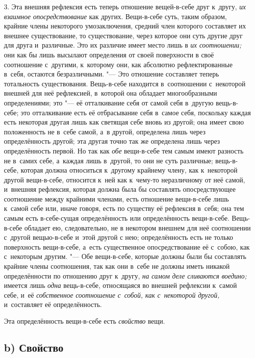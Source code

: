 3. Эта внешняя рефлексия есть теперь отношение вещей-в-себе друг к~другу,
{\em их взаимное опосредствование} как других.
Вещи-в-себе суть, таким образом, крайние члены некоторого умозаключения,
средний член которого составляет их внешнее существование, то
существование, через которое они суть другие друг для друга и~различные.
Это их различие имеет место лишь в {\em их соотношении;} они как бы
лишь высылают определения от своей поверхности в
своё соотношение с~другими, к~которому они, как абсолютно рефлектированные
в~себя, остаются безразличными. "--- Это отношение составляет теперь
тотальность существования. Вещь-в-себе находится в~соотношении с~некоторой
внешней для неё рефлексией, в~которой она обладает многообразными
определениями; это "--- её отталкивание себя от самой себя в~другую вещь-в-себе;
это отталкивание есть её отбрасывание себя в~самое себя, поскольку каждая
есть некоторая другая лишь как светящая себе вновь из другой; она имеет
свою положенность не в~себе самой, а~в другой, определена лишь через
определённость другой; эта другая точно так же определена лишь через
определённость первой. Но так как {\em обе} вещи-в-себе
тем самым имеют разность не в~самих себе, а~каждая лишь в~другой, то они не
суть различные; вещь-в-себе, которая должна относиться к~другому крайнему
члену, как к~некоторой другой вещи-в-себе, относится к~ней как к~чему-то
неразличному от неё самой, и~внешняя рефлексия, которая должна была бы
составлять опосредствующее соотношение между крайними членами, есть
отношение вещи-в-себе лишь к~самой себе или, иначе говоря, есть по существу
её рефлексия в~себя; она тем самым есть в-себе-сущая определённость или
определённость вещи-в-себе. Вещь-в-себе обладает ею, следовательно, не в
некотором внешнем для неё соотношении с~другой вещью-в-себе и~этой другой с
нею; определённость есть не только поверхность вещи-в-себе, а~есть
существенное опосредствование её с~собою, как с~некоторым другим. "--- Обе
вещи-в-себе, которые должны были бы составлять крайние члены соотношения,
так как они в~себе не должны иметь никакой определённости по отношению друг
к~другу, {\em на самом деле сливаются воедино;} имеется лишь {\em одна}
вещь-в-себе, относящаяся во внешней рефлексии к~самой себе, и~её
{\em собственное соотношение с~собой, как с~некоторой другой,}
и~составляет её определённость.

Эта определённость вещи-в-себе есть {\em свойство} вещи.

\subsection[b) Свойство]{b) Свойство}

